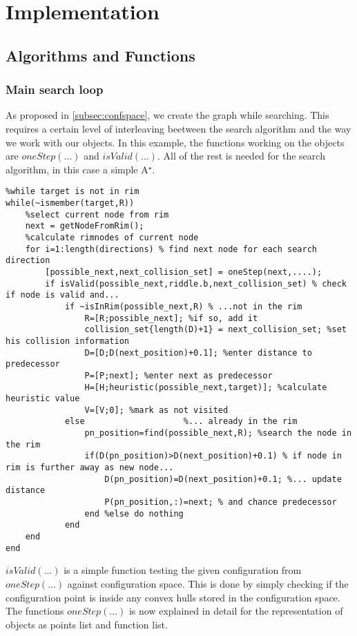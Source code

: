 \chapter{Implementation}
\label{cha:Implementation}

\section{Algorithms and Functions}
\subsection{Main search loop}
As proposed in \ref{subsec:confspace}, we create the graph while searching. This requires a certain level of interleaving beetween the search algorithm and the way we work with our objects. In this example, the functions working on the objects are $oneStep(...)$ and $isValid(...)$. All of the rest is needed for the search algorithm, in this case a simple A$^\star$.

\begin{lstlisting}
%while target is not in rim
while(~ismember(target,R))
    %select current node from rim
    next = getNodeFromRim();  
    %calculate rimnodes of current node 
    for i=1:length(directions) % find next node for each search direction
        [possible_next,next_collision_set] = oneStep(next,....); 
        if isValid(possible_next,riddle.b,next_collision_set) % check if node is valid and...
            if ~isInRim(possible_next,R) % ...not in the rim
                R=[R;possible_next]; %if so, add it
                collision_set{length(D)+1} = next_collision_set; %set his collision information
                D=[D;D(next_position)+0.1]; %enter distance to predecessor
                P=[P;next]; %enter next as predecessor
                H=[H;heuristic(possible_next,target)]; %calculate heuristic value
                V=[V;0]; %mark as not visited
            else                    %... already in the rim
                pn_position=find(possible_next,R); %search the node in the rim
                if(D(pn_position)>D(next_position)+0.1) % if node in rim is further away as new node...
                    D(pn_position)=D(next_position)+0.1; %... update distance
                    P(pn_position,:)=next; % and chance predecessor
                end %else do nothing
            end
    end  
end
\end{lstlisting}

$isValid(...)$ is a simple function testing the given configuration from $oneStep(...)$ against configuration space. This is done by simply checking if the configuration point is inside any convex hulls stored in the configuration space.\\
The functions $oneStep(...)$ is now explained in detail for the representation of objects as points list and function list.
